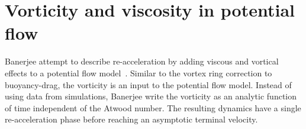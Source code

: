 \section{Vorticity and viscosity in potential flow}

Banerjee \etal attempt to describe re-acceleration by adding viscous and vortical effects to a potential flow model~\cite{Banerjee2011}.
Similar to the vortex ring correction to buoyancy-drag, the vorticity is an input to the potential flow model.
Instead of using data from simulations, Banerjee \etal write the vorticity as an analytic function of time independent of the Atwood number.
The resulting dynamics have a single re-acceleration phase before reaching an asymptotic terminal velocity.

